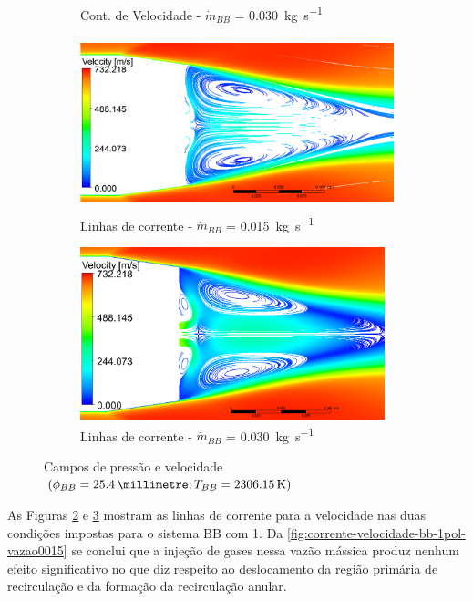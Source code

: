 \begin{figure}[!ht]
\begin{subfigure}[b]{0.47\textwidth}
        \caption{Cont. de Velocidade - \(\Dot{m}_{BB}\) = \qty{0,030}{\kilogram\per\second}}
        \label{fig:contorno-velocidade-bb-1pol-vazao0030}
    \end{subfigure}
    \hfill
    \begin{subfigure}[b]{0.47\textwidth} %
        \centering
        \includegraphics[height=5cm,width=\textwidth]{corrente-velocidade-2306K-vazao-0015-1pol.png}
        \caption{Linhas de corrente - \(\Dot{m}_{BB}\) = \qty{0,015}{\kilogram\per\second}}
        \label{fig:corrente-velocidade-bb-1pol-vazao0015}
    \end{subfigure}
    \hfill
    \begin{subfigure}[b]{0.47\textwidth} %
        \centering
        \includegraphics[height=5cm,width=\textwidth]{corrente-velocidade-2306K-vazao-0030-1pol.png}
        \caption{Linhas de corrente - \(\Dot{m}_{BB}\) = \qty{0,030}{\kilogram\per\second}}
        \label{fig:corrente-velocidade-bb-1pol-vazao0030}
    \end{subfigure}
    \caption{Campos de pressão e velocidade \(\left(\phi_{BB} = \qty{25,4}{\millimetre}; T_{BB} = \qty{2306,15}{\kelvin}\right)\)}
	\label{fig:influencia-diametro-vazao-1pol}
\end{figure}

As Figuras \ref{fig:corrente-velocidade-bb-1pol-vazao0015} e \ref{fig:corrente-velocidade-bb-1pol-vazao0030} mostram as linhas de corrente para a velocidade nas duas condições impostas para o sistema BB com \qty{1}{\polegada}. Da \autoref{fig:corrente-velocidade-bb-1pol-vazao0015} se conclui que a injeção de gases nessa vazão mássica produz nenhum efeito significativo no que diz respeito ao deslocamento da região primária de recirculação e da formação da recirculação anular.

